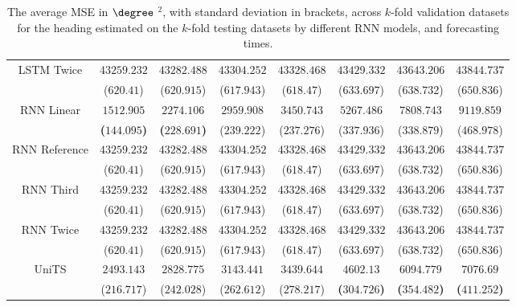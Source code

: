 \begin{table}[!ht]
{\begin{tabular}{|c|c|c|c|c|c|c|c|}
			\multirow{2}{*}{LSTM Twice} & $43259.232$ & $43282.488$ & $43304.252$ & $43328.468$ & $43429.332$ & $43643.206$ & $43844.737$ \\
			 & ($620.41$) & ($620.915$) & ($617.943$) & ($618.47$) & ($633.697$) & ($638.732$) & ($650.836$) \\ \hline
			\multirow{2}{*}{RNN Linear} & $\mathbf{1512.905}$ & $\mathbf{2274.106}$ & $2959.908$ & $3450.743$ & $5267.486$ & $7808.743$ & $9119.859$ \\
			 & \textbf{(}$\mathbf{144.095}$\textbf{)} & \textbf{(}$\mathbf{228.691}$\textbf{)} & ($239.222$) & ($237.276$) & ($337.936$) & ($338.879$) & ($468.978$) \\ \hline
			\multirow{2}{*}{RNN Reference} & $43259.232$ & $43282.488$ & $43304.252$ & $43328.468$ & $43429.332$ & $43643.206$ & $43844.737$ \\
			 & ($620.41$) & ($620.915$) & ($617.943$) & ($618.47$) & ($633.697$) & ($638.732$) & ($650.836$) \\ \hline
			\multirow{2}{*}{RNN Third} & $43259.232$ & $43282.488$ & $43304.252$ & $43328.468$ & $43429.332$ & $43643.206$ & $43844.737$ \\
			 & ($620.41$) & ($620.915$) & ($617.943$) & ($618.47$) & ($633.697$) & ($638.732$) & ($650.836$) \\ \hline
			\multirow{2}{*}{RNN Twice} & $43259.232$ & $43282.488$ & $43304.252$ & $43328.468$ & $43429.332$ & $43643.206$ & $43844.737$ \\
			 & ($620.41$) & ($620.915$) & ($617.943$) & ($618.47$) & ($633.697$) & ($638.732$) & ($650.836$) \\ \hline
			\multirow{2}{*}{UniTS} & $2493.143$ & $2828.775$ & $3143.441$ & $3439.644$ & $\mathbf{4602.13}$ & $\mathbf{6094.779}$ & $\mathbf{7076.69}$ \\
			 & ($216.717$) & ($242.028$) & ($262.612$) & ($278.217$) & \textbf{(}$\mathbf{304.726}$\textbf{)} & \textbf{(}$\mathbf{354.482}$\textbf{)} & \textbf{(}$\mathbf{411.252}$\textbf{)} \\ \hline
		\end{tabular}
	}
	\caption{The average MSE in $\degree$ $^{2}$, with standard deviation in brackets, across $k$-fold validation datasets for the heading estimated on the $k$-fold testing datasets by different RNN models, and forecasting times.}
	\label{tab:all_direction_MSE}
\end{table}

